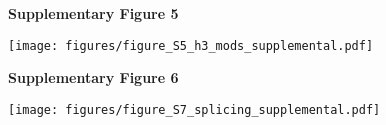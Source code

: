 \documentclass[9pt]{extarticle}
\begin{document}
\newpage

\textbf{\large Supplementary Figure 5}

{\texttt{[image: figures/figure\_S5\_h3\_mods\_supplemental.pdf]}\par}

\newpage




\textbf{\large Supplementary Figure 6}

{\texttt{[image: figures/figure\_S7\_splicing\_supplemental.pdf]}\par}

\newpage
\end{document}
